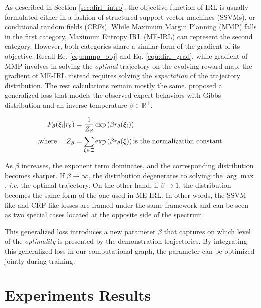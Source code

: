 \documentclass[../thesis.tex]{subfiles}
\begin{document}
As described in Section \ref{sec:dirl_intro}, the objective function of IRL is usually formulated either in a fashion of structured support vector machines (SSVMs), or conditional random fields (CRFs).
While Maximum Margin Planning (MMP) falls in the first category, Maximum Entropy IRL (ME-IRL) can represent the second category.
However, both categories share a similar form of the gradient of its objective.
Recall Eq. \ref{equ:mmp_obj} and Eq. \ref{equ:dirl_grad}, while gradient of MMP involves in solving the \textit{optimal} trajectory on the evolving reward map, the gradient of ME-IRL instead requires solving the \textit{expectation} of the trajectory distribution.
The rest calculations remain mostly the same.
\citet{pletscher2010entropy} proposed a generalized loss that models the observed expert behaviors with Gibbs distribution and an inverse temperature $\beta \in \mathbb R^{+}$.
 
\begin{align}
P_{\beta}(\xi_i | r_\theta) &= \frac{1}{Z_\beta} \exp \left( \beta r_\theta(\xi_i) \right) \\
\text{,where \quad} Z_\beta &= \sum_{\xi \in \Xi} \exp \left( \beta r_\theta(\xi) \right) \text{is the normalization constant.}
\end{align}
 
As $\beta$ increases, the exponent term dominates, and the corresponding distribution becomes sharper.
If $\beta \to \infty$, the distribution degenerates to solving the $\arg\max$, \textit{i.e.} the optimal trajectory.
On the other hand, if $\beta \to 1$, the distribution becomes the same form of the one used in ME-IRL.
In other words, the SSVM-like and CRF-like losses are framed under the same framework and can be seen as two special cases located at the opposite side of the spectrum.
 
This generalized loss introduces a new parameter $\beta$ that captures on which level of the \textit{optimality} is presented by the demonstration trajectories. By integrating this generalized loss in our computational graph, the parameter can be optimized jointly during training.
 
\section{Experiments Results}
 
\end{document}
